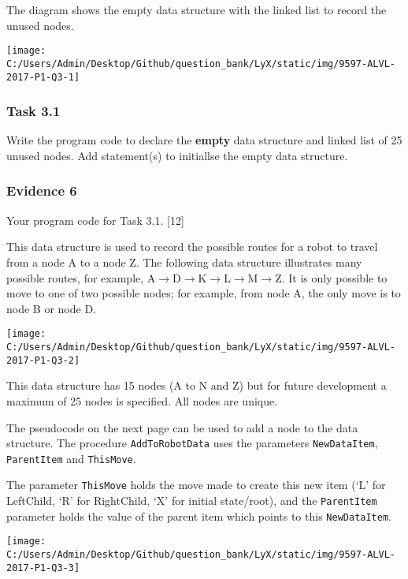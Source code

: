 The diagram shows the empty data structure with the linked list to
record the unused nodes. 
\begin{center}
\texttt{[image: C:/Users/Admin/Desktop/Github/question\_bank/LyX/static/img/9597-ALVL-2017-P1-Q3-1]}
\par\end{center}

\subsubsection*{Task 3.1}

Write the program code to declare the \textbf{empty} data structure
and linked list of 25 unused nodes. Add statement(s) to initiallse
the empty data structure.

\subsubsection*{Evidence 6}

Your program code for Task 3.1. \hfill{}{[}12{]}

This data structure is used to record the possible routes for a robot
to travel from a node A to a node Z. The following data structure
illustrates many possible routes, for example, A$\rightarrow$D$\rightarrow$K$\rightarrow$L$\rightarrow$M$\rightarrow$Z.
It is only possible to move to one of two possible nodes; for example,
from node A, the only move is to node B or node D.
\begin{center}
\texttt{[image: C:/Users/Admin/Desktop/Github/question\_bank/LyX/static/img/9597-ALVL-2017-P1-Q3-2]}
\par\end{center}

This data structure has 15 nodes (A to N and Z) but for future development
a maximum of 25 nodes is specified. All nodes are unique.

The pseudocode on the next page can be used to add a node to the data
structure. The procedure \texttt{AddToRobotData} uses the parameters
\texttt{NewDataItem}, \texttt{ParentItem} and \texttt{ThisMove}.

The parameter \texttt{ThisMove} holds the move made to create this
new item (\textquoteleft L' for LeftChild, \textquoteleft R' for RightChild,
\textquoteleft X\textquoteright{} for initial state/root), and the
\texttt{ParentItem} parameter holds the value of the parent item which
points to this \texttt{NewDataItem}.
\begin{center}
\texttt{[image: C:/Users/Admin/Desktop/Github/question\_bank/LyX/static/img/9597-ALVL-2017-P1-Q3-3]}
\par\end{center}

